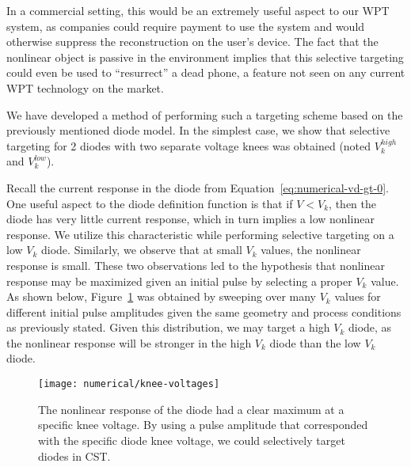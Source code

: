In a commercial setting, this would be an extremely useful aspect to our WPT system, as companies could require payment to use the system and would otherwise suppress the reconstruction on the user's device. The fact that the nonlinear object is passive in the environment implies that this selective targeting could even be used to ``resurrect'' a dead phone, a feature not seen on any current WPT technology on the market.

We have developed a method of performing such a targeting scheme based on the previously mentioned diode model. In the simplest case, we show that selective targeting for 2 diodes with two separate voltage knees was obtained (noted $V_k^{high}$ and $V_k^{low}$).

Recall the current response in the diode from Equation~\ref{eq:numerical-vd-gt-0}. One useful aspect to the diode definition function is that if $V < V_{k}$, then the diode has very little current response, which in turn implies a low nonlinear response. We utilize this characteristic while performing selective targeting on a low $V_{k}$ diode. Similarly, we observe that at small $V_{k}$ values, the nonlinear response is small. These two observations led to the hypothesis that nonlinear response may be maximized given an initial pulse by selecting a proper $V_{k}$ value. As shown below, Figure~\ref{fig:numerical-knee-voltages} was obtained by sweeping over many $V_{k}$ values for different initial pulse amplitudes given the same geometry and process conditions as previously stated. Given this distribution, we may target a high $V_{k}$ diode, as the nonlinear response will be stronger in the high $V_{k}$ diode than the low $V_{k}$ diode.

\begin{figure}[t]
\centering
\texttt{[image: numerical/knee-voltages]}
\caption[Nonlinear response due to different diode characteristics]{The nonlinear response of the diode had a clear maximum at a specific knee voltage. By using a pulse amplitude that corresponded with the specific diode knee voltage, we could selectively target diodes in CST.}
\label{fig:numerical-knee-voltages}
\end{figure}


